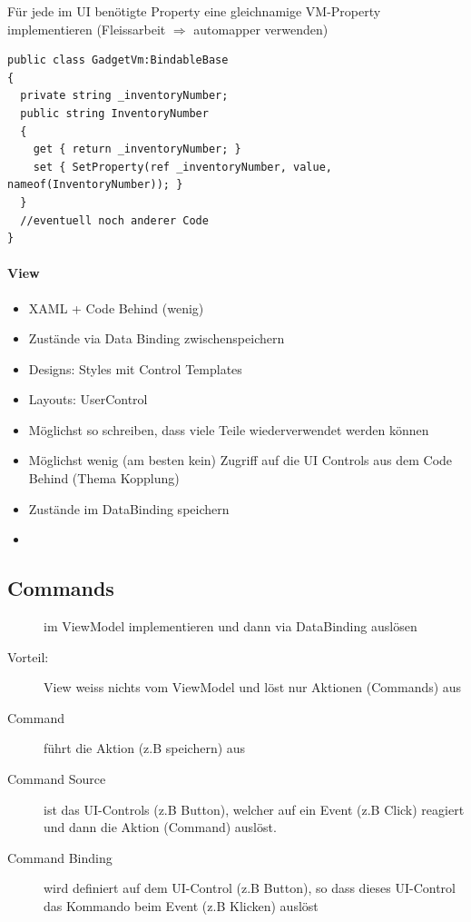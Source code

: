 Für jede im UI benötigte Property eine gleichnamige VM-Property implementieren (Fleissarbeit $\Rightarrow$ automapper verwenden)
\begin{lstlisting}[language=sharpc]
public class GadgetVm:BindableBase 
{ 
  private string _inventoryNumber; 
  public string InventoryNumber 
  { 
    get { return _inventoryNumber; } 
    set { SetProperty(ref _inventoryNumber, value, nameof(InventoryNumber)); } 
  } 
  //eventuell noch anderer Code 
}
\end{lstlisting}

\paragraph{View} 
\begin{itemize}
    \item XAML + Code Behind (wenig)
    \item Zustände via Data Binding zwischenspeichern
    \item Designs: Styles mit Control Templates
    \item Layouts: UserControl
    \item Möglichst so schreiben, dass viele Teile wiederverwendet werden können
    \item Möglichst wenig (am besten kein) Zugriff auf die UI Controls aus dem Code Behind (Thema Kopplung)
    \item Zustände im DataBinding speichern
    \item 
\end{itemize}





\subsection{Commands}
\begin{description}
    \item[] im ViewModel implementieren und dann via DataBinding auslösen
    \item[Vorteil:] View weiss nichts vom ViewModel und löst nur Aktionen (Commands) aus
    \item[Command] führt die Aktion (z.B speichern) aus
    \item[Command Source] ist das UI-Controls (z.B Button), welcher auf ein Event (z.B Click) reagiert und dann die Aktion (Command) auslöst.
    \item[Command Binding] wird definiert auf dem UI-Control (z.B Button), so dass dieses UI-Control das Kommando beim Event (z.B Klicken) auslöst
\end{description}

